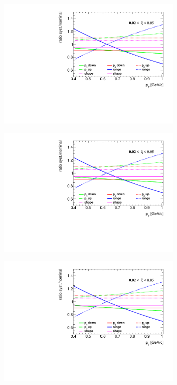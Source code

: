  \begin{figure}[h!]
 	\centering
 	\begin{subfigure}{.49\textwidth}
 		\includegraphics[width=\textwidth,page=1]{chapters/chrgSTAR/img/DCAproton/p_bkg.pdf}
 	\end{subfigure}
 	\begin{subfigure}{.49\textwidth}
 		\includegraphics[width=\textwidth,page=2]{chapters/chrgSTAR/img/DCAproton/p_bkg.pdf}
 	\end{subfigure}
 	\begin{subfigure}{.49\textwidth}
 		\includegraphics[width=\textwidth,page=3]{chapters/chrgSTAR/img/DCAproton/p_bkg.pdf}

\end{subfigure}
\end{figure}
